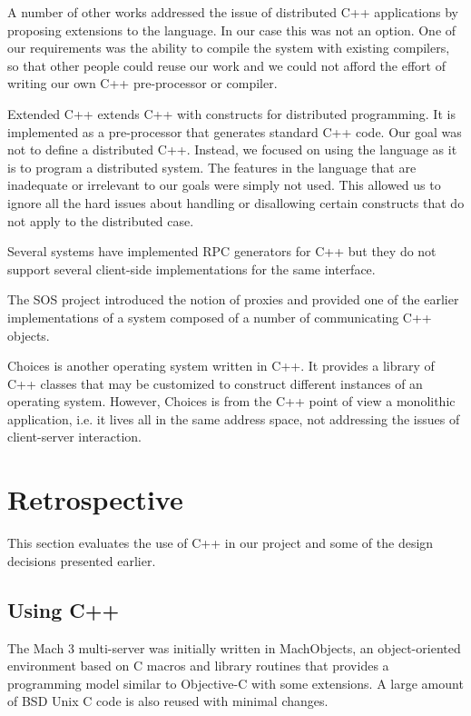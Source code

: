 A number of other works addressed the issue of distributed C++
applications by proposing extensions to the
language\cite{wrappers,comandosoopsla}. In our case this was not
an option. One of our requirements was the ability to compile the
system with existing compilers, so that other people could reuse our
work and we could not afford the effort of writing our own C++
pre-processor or compiler.

Extended C++\cite{ec++} extends C++ with constructs for distributed
programming. It is implemented as a pre-processor that generates
standard C++ code. Our goal was not to define a distributed C++.
Instead, we focused on using the language as it is to program a
distributed system. The features in the language that are inadequate
or irrelevant to our goals were simply not used. This allowed us to
ignore all the hard issues about handling or disallowing certain
constructs that do not apply to the distributed case.

Several systems have implemented RPC generators for C++ 
\cite{distc++,arjuna} but they do not support several client-side
implementations for the same interface.

The SOS project\cite{sos} introduced the notion of proxies and
provided one of the earlier implementations of a system composed of a
number of communicating C++ objects.

Choices\cite{choices} is another operating system written in C++. It
provides a library of C++ classes that may be customized to construct
different instances of an operating system. However, Choices is from
the C++ point of view a monolithic application, i.e. it lives all in
the same address space, not addressing the issues of client-server
interaction.

\section{Retrospective}

This section evaluates the use of C++ in our project and some of the
design decisions presented earlier.

\subsection{Using C++}

The Mach 3 multi-server was initially written in
MachObjects\cite{machobjects}, an object-oriented environment based on
C macros and library routines that provides a programming
model similar to Objective-C with some extensions. A large amount of
BSD Unix C code is also reused with minimal changes.

